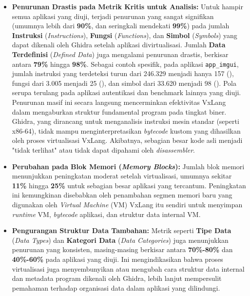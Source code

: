 \begin{itemize}
    \item \textbf{Penurunan Drastis pada Metrik Kritis untuk Analisis:}
    Untuk hampir semua aplikasi yang diuji, terjadi penurunan yang sangat signifikan (umumnya lebih dari \textbf{90\%}, dan seringkali mendekati \textbf{99\%}) pada jumlah \textbf{Instruksi} (\textit{Instructions}), \textbf{Fungsi} (\textit{Functions}), dan \textbf{Simbol} (\textit{Symbols}) yang dapat dikenali oleh Ghidra setelah aplikasi divirtualisasi. Jumlah \textbf{Data Terdefinisi} (\textit{Defined Data}) juga mengalami penurunan drastis, berkisar antara \textbf{79\%} hingga \textbf{98\%}.
    Sebagai contoh spesifik, pada aplikasi \texttt{app\_imgui}, jumlah instruksi yang terdeteksi turun dari 246.329 menjadi hanya 157 (), fungsi dari 3.005 menjadi 25 (), dan simbol dari 33.620 menjadi 98 (). Pola serupa terulang pada aplikasi autentikasi dan benchmark lainnya yang diuji.
    Penurunan masif ini secara langsung mencerminkan efektivitas VxLang dalam mengaburkan struktur fundamental program pada tingkat biner. Ghidra, yang dirancang untuk menganalisis instruksi mesin standar (seperti x86-64), tidak mampu menginterpretasikan \textit{bytecode} kustom yang dihasilkan oleh proses virtualisasi VxLang. Akibatnya, sebagian besar kode asli menjadi "tidak terlihat" atau tidak dapat dipahami oleh \textit{disassembler}.

    \item \textbf{Perubahan pada Blok Memori (\textit{Memory Blocks}):}
    Jumlah blok memori menunjukkan peningkatan moderat setelah virtualisasi, umumnya sekitar \textbf{11\%} hingga \textbf{25\%} untuk sebagian besar aplikasi yang tercantum. Peningkatan ini kemungkinan disebabkan oleh penambahan segmen memori baru yang digunakan oleh \textit{Virtual Machine} (VM) VxLang itu sendiri untuk menyimpan \textit{runtime} VM, \textit{bytecode} aplikasi, dan struktur data internal VM.

    \item \textbf{Pengurangan Struktur Data Tambahan:}
    Metrik seperti \textbf{Tipe Data} (\textit{Data Types}) dan \textbf{Kategori Data} (\textit{Data Categories}) juga menunjukkan penurunan yang konsisten, masing-masing berkisar antara \textbf{70\%-80\%} dan \textbf{40\%-60\%} pada aplikasi yang diuji. Ini mengindikasikan bahwa proses virtualisasi juga menyembunyikan atau mengubah cara struktur data internal dan metadata program dikenali oleh Ghidra, lebih lanjut mempersulit pemahaman terhadap organisasi data dalam aplikasi yang dilindungi.


\end{itemize}
